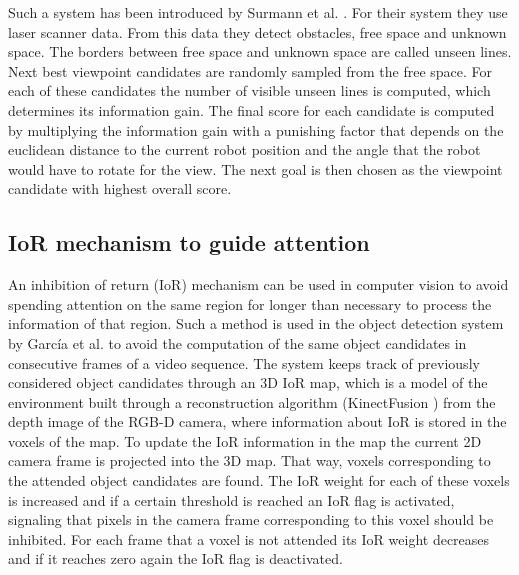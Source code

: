 \documentclass[a4paper,11pt,english]{article}
\begin{document}
Such a system has been introduced by Surmann et al. \cite{surmann2003autonomous}.
For their system they use laser scanner data. From this data they detect obstacles, free space and unknown space.
The borders between free space and unknown space are called unseen lines.
Next best viewpoint candidates are randomly sampled from the free space.
For each of these candidates the number of visible unseen lines is computed, which determines its information gain.
The final score for each candidate is computed by multiplying the information gain with a punishing factor that depends on the euclidean distance to the current robot position and the angle that the robot would have to rotate for the view.
The next goal is then chosen as the viewpoint candidate with highest overall score.

\subsection{IoR mechanism to guide attention}
\label{Theoretical_background:IoR mechanism_to_guide_attention}
An inhibition of return (IoR) mechanism can be used in computer vision to avoid spending attention on the same region for longer than necessary to process the information of that region.
Such a method is used in the object detection system by García et al. \cite{garcia2015saliency} to avoid the computation of the same object candidates in consecutive frames of a video sequence.
The system keeps track of previously considered object candidates through an 3D IoR map, which is a model of the environment built through a reconstruction algorithm (KinectFusion \cite{newcombe2011kinectfusion}) from the depth image of the RGB-D camera, where information about IoR is stored in the voxels of the map.
To update the IoR information in the map the current 2D camera frame is projected into the 3D map.
That way, voxels corresponding to the attended object candidates are found.
The IoR weight for each of these voxels is increased and if a certain threshold is reached an IoR flag is activated, signaling that pixels in the camera frame corresponding to this voxel should be inhibited.
For each frame that a voxel is not attended its IoR weight decreases and if it reaches zero again the IoR flag is deactivated.
\end{document}
